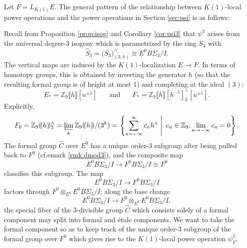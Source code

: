 \documentclass{gtpart}
\theoremstyle{definition}
\theoremstyle{remark}
\newcommand{\mb}[1]{\mathbb{#1}}
\newcommand{\BZ}{{\mb Z}}
\newcommand{\HC}{\widehat{C}}
\newcommand{\HS}{\widehat{S}}
\newcommand{\p}{\psi^3}
\begin{document}
Let $F = L_{K(1)} E$.  The general pattern of the relationship between $K(1)$-local power operations and the power operations in Section \ref{sec:psi} is as follows: 
\begin{center}
\end{center}
Recall from Proposition \ref{prop:isog} and Corollary \ref{cor:psi3} that $\p$ arises from the universal degree-3 isogeny 
which is parametrized by the ring $S_3$ with 
\[
 \HS_3 = \big( S_3 \big)_{(3,h)}^\wedge \cong E^0 B\Sigma_3 / I.  
\]
The vertical maps are induced by the $K(1)$-localization $E \to F$.  In terms of 
homotopy groups, this is obtained by inverting the generator $h$ (so that 
the resulting formal group is of height at most 1) and completing at the ideal 
$(3)$: 
\[
 E_* = \BZ_9 \llbracket h \rrbracket [u^{\pm1}]~~~~~~~~\text{and}~~~~~~~~F_* = \BZ_9 \llbracket h \rrbracket [h^{-1}]_3^\wedge [u^{\pm1}].  
\]
Explicitly, 
\begin{equation}
\label{explicit}
 F_0 = \BZ_9 (\!(h)\!)_3^\wedge = \varprojlim_k \BZ_9 (\!(h)\!) /(3^k) = 
 \left.\left\{\sum_{n = -\infty}^{\infty} c_n h^n~\right|~c_n \in \BZ_9, 
 \lim_{n \to -\infty} c_n = 0\right\}.  
\end{equation}
The formal group $\HC$ over $E^0$ has a unique order-3 subgroup after being pulled back to $F^0$ (cf.emark \ref{rmk:dmod3}), 
and the composite map 
\[
 E^0 B\Sigma_3 / I \to F^0 B\Sigma_3 / I \cong F^0 
\]
classifies this subgroup.  
The map 
\[
 E^0 B\Sigma_3 / I \to F^0 B\Sigma_3 / I 
\]
factors through $F^0 \otimes_{E^0} E^0 B\Sigma_3 / I$; along the base change 
\[
 E^0 B\Sigma_3 / I \to F^0 \otimes_{E^0} E^0 B\Sigma_3 / I, 
\]
the special fiber of the 3-divisible group $\HC$ which consists solely of a formal component may split into formal and \'etale components.  
We want to take the formal component so as to keep track of the unique order-3 subgroup of the formal group over $F^0$ 
which gives rise to the $K(1)$-local power operation $\psi_F^3$.  
\end{document}
